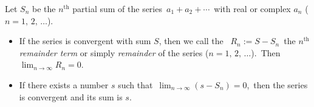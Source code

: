 \documentclass[12pt]{article}
\begin{document}
Let $S_n$ be the $n^\mathrm{th}$ partial sum of the series\, $a_1\!+\!a_2\!+\cdots$\, with real or complex  $a_n$ ($n = 1,\,2,\,\ldots$). 
\begin{itemize}
  \item If the series is convergent with sum $S$, then we call the \, $R_n := S\!-\!S_n$\, the  $n^\mathrm{th}$ {\em remainder term} or simply {\em remainder} of the series ($n = 1,\,2,\,\ldots$).\, Then\, $\lim_{n\to\infty}R_n = 0$.
  \item If there exists a number $s$ such that\, $\lim_{n\to\infty}(s\!-\!S_n) = 0$,\, then the series is convergent and its sum is $s$.
\end{itemize}
\end{document}
